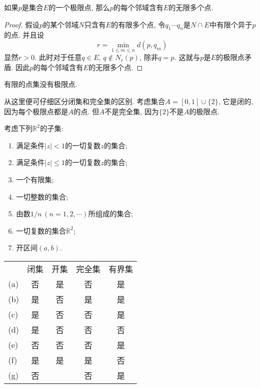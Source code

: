 \documentclass[cn,12pt,math=mtpro2,citestyle=gb7714-2015,bibstyle=gb7714-2015,twocol]{elegantbook}
\newcommand{\R}{\mathbb{R}}
\begin{document}
\begin{theorem}\label{thm:th2.4}
  如果$p$是集合$E$的一个极限点, 那么$p$的每个邻域含有$E$的无限多个点.
\end{theorem}
\begin{proof}
  假设$p$的某个邻域$N$只含有$E$的有限多个点, 令$q_1\cdots q_n$是$N\cap E$中有限个异于$p$的点. 并且设
  $$r=\min_{1\leq m\leq n}d(p, q_m)$$
  显然$r>0$. 此时对于任意$ q\in E$, $q\notin N_r(p)$, 除非$q=p$. 这就与$p$是$E$的极限点矛盾. 因此$p$的每个邻域含有$E$的无限多个点.


\end{proof}
\begin{corollary}
有限的点集没有极限点.
\end{corollary}
从这里便可仔细区分闭集和完全集的区别. 考虑集合$A=[0,1]\cup \{2\}$, 它是闭的, 因为每个极限点都是$A$的点. 但$A$不是完全集, 因为$\{2\}$不是$A$的极限点.
\begin{example}
考虑下列$\R^2$的子集:
\begin{enumerate}[label=(\alph*)]
\item 满足条件$|z|<1$的一切复数$z$的集合;

\item 满足条件$|z|\leq1$的一切复数$z$的集合;

\item 一个有限集;

\item 一切整数的集合;

\item 由数$1/n\,(n=1,2,\cdots)$所组成的集合;

\item 一切复数的集合$\R^2$;

\item 开区间$(a,b)$.
\end{enumerate}
\end{example}

\begin{table}[!htbp]
\centering
\renewcommand{\arraystretch}{1.5}
\begin{tabular}{lcccc}
    & 闭集 & 开集 & 完全集 & 有界集 \\
(a) & 否  & 是  & 否   & 是   \\
(b) & 是  & 否  & 是   & 是   \\
(c) & 是  & 否  & 否   & 是   \\
(d) & 是  & 否  & 否   & 否   \\
(e) & 否  & 否  & 否   & 是   \\
(f) & 是  & 是  & 是   & 否   \\
(g) & 否  &    & 否   & 是
\end{tabular}
\end{table}
\end{document}

